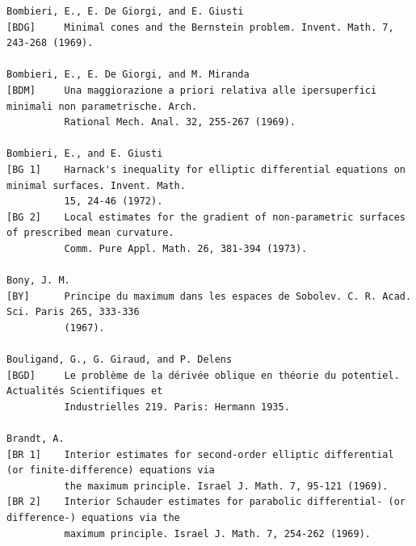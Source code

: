\begin{verbatim}
Bombieri, E., E. De Giorgi, and E. Giusti
[BDG]     Minimal cones and the Bernstein problem. Invent. Math. 7, 243-268 (1969).

Bombieri, E., E. De Giorgi, and M. Miranda
[BDM]     Una maggiorazione a priori relativa alle ipersuperfici minimali non parametrische. Arch.
          Rational Mech. Anal. 32, 255-267 (1969).

Bombieri, E., and E. Giusti
[BG 1]    Harnack's inequality for elliptic differential equations on minimal surfaces. Invent. Math.
          15, 24-46 (1972).
[BG 2]    Local estimates for the gradient of non-parametric surfaces of prescribed mean curvature.
          Comm. Pure Appl. Math. 26, 381-394 (1973).

Bony, J. M.
[BY]      Principe du maximum dans les espaces de Sobolev. C. R. Acad. Sci. Paris 265, 333-336
          (1967).

Bouligand, G., G. Giraud, and P. Delens
[BGD]     Le problème de la dérivée oblique en théorie du potentiel. Actualités Scientifiques et
          Industrielles 219. Paris: Hermann 1935.

Brandt, A.
[BR 1]    Interior estimates for second-order elliptic differential (or finite-difference) equations via
          the maximum principle. Israel J. Math. 7, 95-121 (1969).
[BR 2]    Interior Schauder estimates for parabolic differential- (or difference-) equations via the
          maximum principle. Israel J. Math. 7, 254-262 (1969).
\end{verbatim}

